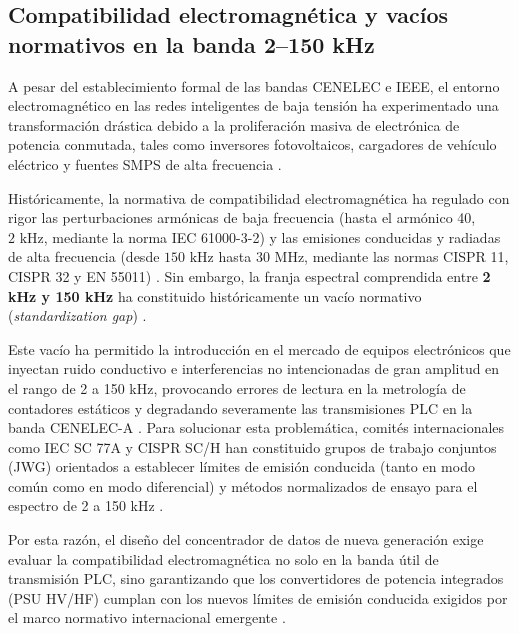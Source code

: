 \subsection{Compatibilidad electromagnética y vacíos normativos en la banda 2--150 kHz}
\label{subsec:vacio_normativo_2_150kHz}

A pesar del establecimiento formal de las bandas CENELEC e IEEE, el entorno electromagnético en las redes inteligentes de baja tensión ha experimentado una transformación drástica debido a la proliferación masiva de electrónica de potencia conmutada, tales como inversores fotovoltaicos, cargadores de vehículo eléctrico y fuentes SMPS de alta frecuencia \cite{8495356}.

Históricamente, la normativa de compatibilidad electromagnética ha regulado con rigor las perturbaciones armónicas de baja frecuencia (hasta el armónico 40, $2\text{ kHz}$, mediante la norma IEC 61000-3-2) y las emisiones conducidas y radiadas de alta frecuencia (desde $150\text{ kHz}$ hasta $30\text{ MHz}$, mediante las normas CISPR 11, CISPR 32 y EN 55011) \cite{8495356}. Sin embargo, la franja espectral comprendida entre \textbf{2 kHz y 150 kHz} ha constituido históricamente un vacío normativo (\textit{standardization gap}) \cite{8495356}.

Este vacío ha permitido la introducción en el mercado de equipos electrónicos que inyectan ruido conductivo e interferencias no intencionadas de gran amplitud en el rango de 2 a 150 kHz, provocando errores de lectura en la metrología de contadores estáticos y degradando severamente las transmisiones PLC en la banda CENELEC-A \cite{8495356}. Para solucionar esta problemática, comités internacionales como IEC SC 77A y CISPR SC/H han constituido grupos de trabajo conjuntos (JWG) orientados a establecer límites de emisión conducida (tanto en modo común como en modo diferencial) y métodos normalizados de ensayo para el espectro de 2 a 150 kHz \cite{8495356}.

Por esta razón, el diseño del concentrador de datos de nueva generación exige evaluar la compatibilidad electromagnética no solo en la banda útil de transmisión PLC, sino garantizando que los convertidores de potencia integrados (PSU HV/HF) cumplan con los nuevos límites de emisión conducida exigidos por el marco normativo internacional emergente \cite{8495356, 6679210}.